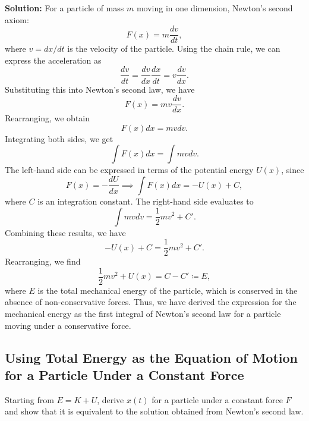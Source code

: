 \documentclass[../main.tex]{subfiles}
\begin{document}
\textbf{Solution:} For a particle of mass $m$ moving in one dimension, Newton's second axiom:
\begin{equation}
    F(x) = m\frac{dv}{dt},
\end{equation}
where $v = dx/dt$ is the velocity of the particle. Using the chain rule, we can express the acceleration as
\begin{equation}
    \frac{dv}{dt} = \frac{dv}{dx}\frac{dx}{dt} = v\frac{dv}{dx}.
\end{equation}
Substituting this into Newton's second law, we have
\begin{equation}
    F(x) = m v \frac{dv}{dx}.
\end{equation}
Rearranging, we obtain
\begin{equation}
    F(x) dx = m v dv.
\end{equation}
Integrating both sides, we get
\begin{equation}
    \int F(x) dx = \int m v dv.
\end{equation}
The left-hand side can be expressed in terms of the potential energy $U(x)$, since
\begin{equation}
    F(x) = -\frac{dU}{dx} \implies \int F(x) dx = -U(x) + C,
\end{equation}
where $C$ is an integration constant. The right-hand side evaluates to
\begin{equation}
    \int m v dv = \frac{1}{2} m v^2 + C'.
\end{equation}
Combining these results, we have
\begin{equation}
    -U(x) + C = \frac{1}{2} m v^2 + C'.
\end{equation}
Rearranging, we find
\begin{equation}
    \frac{1}{2} m v^2 + U(x) = C - C' \coloneqq E,
\end{equation}
where $E$ is the total mechanical energy of the particle, which is conserved in the absence of non-conservative forces. Thus, we have derived the expression for the mechanical energy as the first integral of Newton's second law for a particle moving under a conservative force.



\subsection{Using Total Energy as the Equation of Motion for a Particle Under a Constant Force}

Starting from $E = K + U$, derive $x(t)$ for a particle under a constant force $F$ and show that it is equivalent to the solution obtained from Newton's second law.
\end{document}
